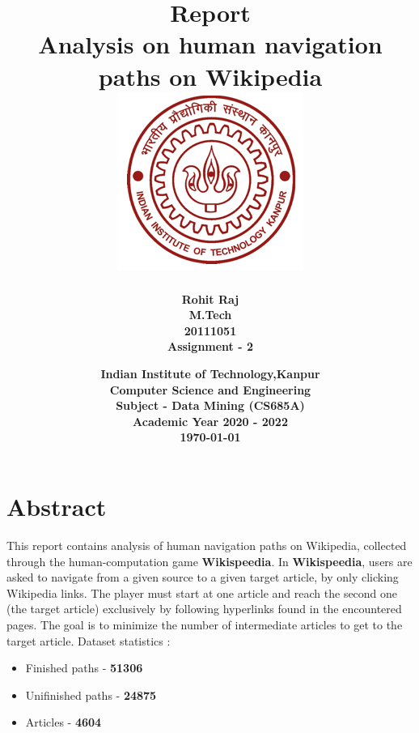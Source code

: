 \documentclass[12pt,a4paper]{report}
\title{\textbf{Report} \\[6mm] \textbf{Analysis on human navigation paths on Wikipedia} \\[1.5cm]  \includegraphics[scale=0.8]{logo}}
\author{\textbf{Rohit Raj} \\\textbf{M.Tech}\\ \textbf{20111051}\\\textbf{Assignment - 2}}
\date{\textbf{Indian Institute of Technology,Kanpur} \\\textbf{Computer Science and Engineering} \\\textbf{Subject - Data Mining (CS685A)}\\\textbf{Academic Year 2020 - 2022} \\[5mm]\textbf{\today}}
\begin{document}
\maketitle

\chapter{Abstract}

\begin{flushleft}
This report contains analysis of human navigation paths on Wikipedia, collected through the human-computation game \textbf{Wikispeedia}. In \textbf{Wikispeedia}, users are asked to navigate from a given source to a given target article, by only clicking Wikipedia links. The player must start at one article and reach the second one (the target article) exclusively by following hyperlinks found in the encountered pages. The goal is to minimize the number of intermediate articles to get to the target article.\newline
Dataset statistics :
\begin{itemize}
    \item Finished paths - \textbf{51306}
    \item Unifinished paths - \textbf{24875}
    \item Articles - \textbf{4604}
\end{itemize}


\end{flushleft}

\newpage
\end{document}
